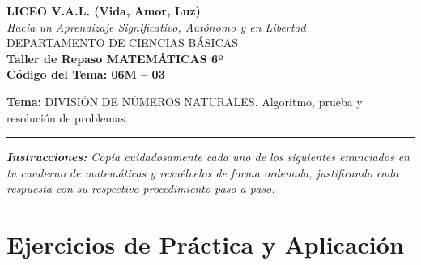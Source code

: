 \documentclass[12pt, letterpaper]{article}
\begin{document}
	\begin{center}
		{\Large \textbf{LICEO V.A.L. (Vida, Amor, Luz)}}\\[0.1cm]
		{\normalsize \textit{Hacia un Aprendizaje Significativo, Autónomo y en Libertad}}\\[0.2cm]
		{\large DEPARTAMENTO DE CIENCIAS BÁSICAS}\\[0.1cm]
		\textbf{Taller de Repaso MATEMÁTICAS 6º}\\[0.1cm]
		\textbf{Código del Tema: 06M – 03}\\[0.1cm]
	\end{center}
	
	\vspace{0.2cm}
	\noindent \textbf{Tema:} DIVISIÓN DE NÚMEROS NATURALES. Algoritmo, prueba y resolución de problemas.
	\vspace{0.2cm}
	\hrule
	\vspace{0.4cm}
	
	\noindent \textit{\textbf{Instrucciones:} Copia cuidadosamente cada uno de los siguientes enunciados en tu cuaderno de matemáticas y resuélvelos de forma ordenada, justificando cada respuesta con su respectivo procedimiento paso a paso.}
	\vspace{0.6cm}
	
	\section*{Ejercicios de Práctica y Aplicación}
	
\end{document}
